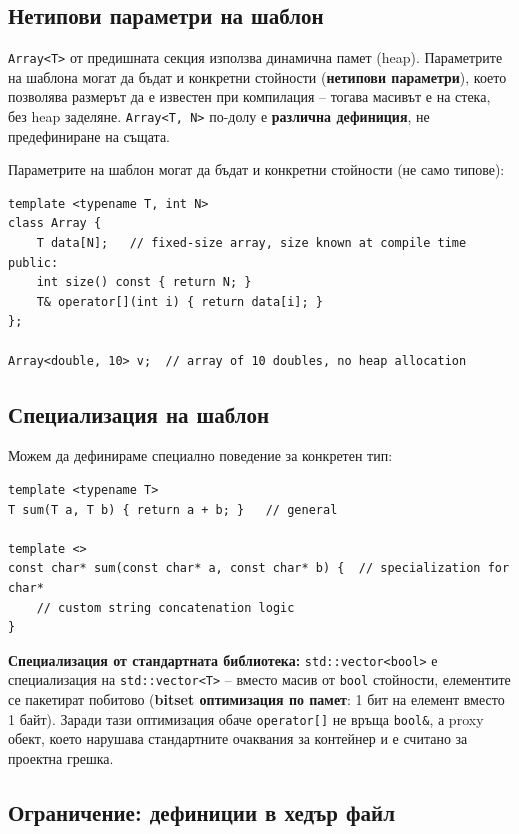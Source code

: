 \documentclass{scrartcl}
\begin{document}
\begin{FlushLeft}
\subsection{Нетипови параметри на шаблон}

\texttt{Array<T>} от предишната секция използва динамична памет (heap). Параметрите на шаблона могат да бъдат и конкретни стойности (\textbf{нетипови параметри}), което позволява размерът да е известен при компилация -- тогава масивът е на стека, без heap заделяне. \texttt{Array<T, N>} по-долу е \textbf{различна дефиниция}, не предефиниране на същата.

Параметрите на шаблон могат да бъдат и конкретни стойности (не само типове):

\begin{lstlisting}
template <typename T, int N>
class Array {
    T data[N];   // fixed-size array, size known at compile time
public:
    int size() const { return N; }
    T& operator[](int i) { return data[i]; }
};

Array<double, 10> v;  // array of 10 doubles, no heap allocation
\end{lstlisting}

\subsection{Специализация на шаблон}

Можем да дефинираме специално поведение за конкретен тип:

\begin{lstlisting}
template <typename T>
T sum(T a, T b) { return a + b; }   // general

template <>
const char* sum(const char* a, const char* b) {  // specialization for char*
    // custom string concatenation logic
}
\end{lstlisting}

\textbf{Специализация от стандартната библиотека:} \texttt{std::vector<bool>} е специализация на \texttt{std::vector<T>} -- вместо масив от \texttt{bool} стойности, елементите се пакетират побитово (\textbf{bitset оптимизация по памет}: 1 бит на елемент вместо 1 байт). Заради тази оптимизация обаче \texttt{operator[]} не връща \texttt{bool\&}, а proxy обект, което нарушава стандартните очаквания за контейнер и е считано за проектна грешка.

\subsection{Ограничение: дефиниции в хедър файл}


\end{FlushLeft}
\end{document}
